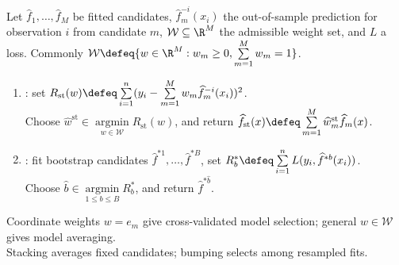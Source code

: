 \begin{method} \label{meth:sl-stacking-and-bumping} \\
Let $\widehat{f}_1,\ldots,\widehat{f}_M$ be fitted candidates, $\widehat{f}^{-i}_m(x_i)$ the out-of-sample prediction for observation $i$ from candidate $m$, $\mathcal{W}\subseteq\R^M$ the admissible weight set, and $L$ a loss. Commonly $\mathcal{W}\defeq\{w\in\R^M:w_m\geq0,\sum\limits_{m=1}^M w_m=1\}$.
\begin{enumerate}[label=(\roman*)]
\setlength{\itemsep}{0pt}
\item {}: set $R_{\mathrm{st}}(w)\defeq\sum\limits_{i=1}^n(y_i-\sum\limits_{m=1}^M w_m\widehat{f}^{-i}_m(x_i))^2$.\\
Choose $\widehat{w}^{\mathrm{st}}\in\operatorname*{argmin}\limits_{w\in\mathcal{W}}R_{\mathrm{st}}(w)$, and return $\widehat{f}_{\mathrm{st}}(x)\defeq\sum\limits_{m=1}^M\widehat{w}^{\mathrm{st}}_m\widehat{f}_m(x)$.
\item {}: fit bootstrap candidates $\widehat{f}^{*1},\ldots,\widehat{f}^{*B}$, set $R_b^*\defeq\sum\limits_{i=1}^n L(y_i,\widehat{f}^{*b}(x_i))$.\\
Choose $\widehat{b}\in\operatorname*{argmin}\limits_{1\leq b\leq B}R_b^*$, and return $\widehat{f}^{*\widehat{b}}$.
\end{enumerate}
Coordinate weights $w=e_m$ give cross-validated model selection; general $w\in\mathcal{W}$ gives model averaging.\\
Stacking averages fixed candidates; bumping selects among resampled fits.
\end{method}
